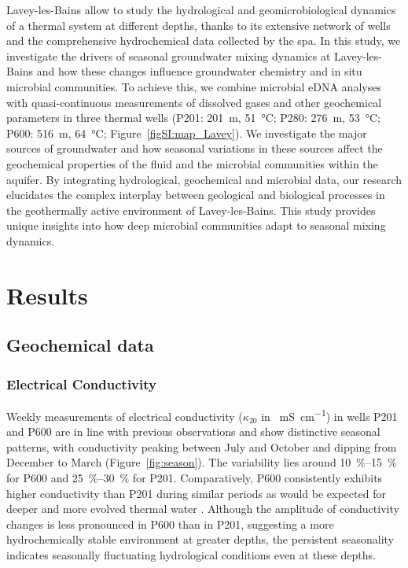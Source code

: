 Lavey-les-Bains allow to study the hydrological and geomicrobiological dynamics of a thermal system at different depths, thanks to its extensive network of wells and the comprehensive hydrochemical data collected by the spa.
In this study, we investigate the drivers of seasonal groundwater mixing dynamics at Lavey-les-Bains and how these changes influence groundwater chemistry and in situ microbial communities.
To achieve this, we combine microbial eDNA analyses with quasi-continuous measurements of dissolved gases and other geochemical parameters in three thermal wells (P201: \SI{201}{\metre}, \SI{51}{\celsius}; P280: \SI{276}{\metre}, \SI{53}{\celsius}; P600: \SI{516}{\metre}, \SI{64}{\celsius}; Figure~\ref{figSI:map_Lavey}).
We investigate the major sources of groundwater and how seasonal variations in these sources affect the geochemical properties of the fluid and the microbial communities within the aquifer.
By integrating hydrological, geochemical and microbial data, our research elucidates the complex interplay between geological and biological processes in the geothermally active environment of Lavey-les-Bains.
This study provides unique insights into how deep microbial communities adapt to seasonal mixing dynamics.


\section{Results}
\subsection{Geochemical data}
\subsubsection{Electrical Conductivity} 
Weekly measurements of electrical conductivity ($\kappa_{20}$ in \SI{}{\milli\siemens\per\centi\metre}) in wells P201 and P600 are in line with previous observations \citep{sonney2009numerical} and show distinctive seasonal patterns, with conductivity peaking between July and October and dipping from December to March (Figure~\ref{fig:season}).
The variability lies around \SIrange{10}{15}{\percent} for P600 and \SIrange{25}{30}{\percent} for P201.
Comparatively, P600 consistently exhibits higher conductivity than P201 during similar periods as would be expected for deeper and more evolved thermal water \citep{nono2020electrical}.
Although the amplitude of conductivity changes is less pronounced in P600 than in P201, suggesting a more hydrochemically stable environment at greater depths, the persistent seasonality indicates seasonally fluctuating hydrological conditions even at these depths.

